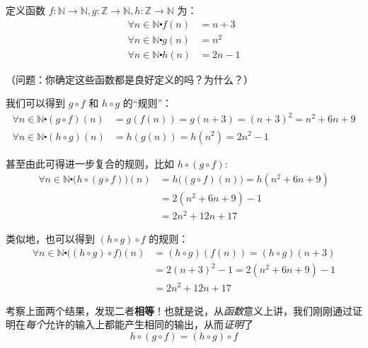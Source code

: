 \begin{example}
    定义函数 $f : \mathbb{N} \to \mathbb{N}, g : \mathbb{Z} \to \mathbb{N}, h : \mathbb{Z} \to \mathbb{N}$ 为：
    \begin{align*}
        \forall n \in \mathbb{N} \centerdot f(n) & = n + 3  \\
        \forall n \in \mathbb{N} \centerdot g(n) & = n^2    \\
        \forall n \in \mathbb{N} \centerdot h(n) & = 2n - 1
    \end{align*}
    
    （问题：你确定这些函数都是良好定义的吗？为什么？）

    我们可以得到 $g \circ f$ 和 $h \circ g$ 的``规则''：
    \begin{align*}
        \forall n \in \mathbb{N} \centerdot (g \circ f)(n) & = g(f(n)) = g(n + 3) = (n + 3)^2 = n^2 + 6n + 9 \\
        \forall n \in \mathbb{N} \centerdot (h \circ g)(n) & = h(g(n)) = h(n^2) = 2n^2-1
    \end{align*}

    甚至由此可得进一步复合的规则，比如 $h \circ (g \circ f)$:
    \begin{align*}
        \forall n \in \mathbb{N} \centerdot \big(h \circ (g \circ f)\big)(n) & = h\big((g \circ f)(n)\big) = h(n^2 + 6n + 9) \\
                                                                             & = 2(n^2 + 6n + 9) - 1                         \\
                                                                             & = 2n^2 + 12n + 17
    \end{align*}

    类似地，也可以得到 $(h \circ g) \circ f$ 的规则：
    \begin{align*}
        \forall n \in \mathbb{N} \centerdot \big((h \circ g) \circ f\big)(n) & = (h \circ g)(f(n)) = (h \circ g)(n + 3) \\
                                                                             & = 2(n + 3)^2 - 1 = 2(n^2 + 6n + 9) - 1   \\
                                                                             & = 2n^2 + 12n + 17
    \end{align*}
\end{example}

考察上面两个结果，发现二者\textbf{相等}！也就是说，从\emph{函数}意义上讲，我们刚刚通过证明在\emph{每个}允许的输入上都能产生相同的输出，从而\emph{证明}了
\[h \circ (g \circ f) = (h \circ g) \circ f\]

